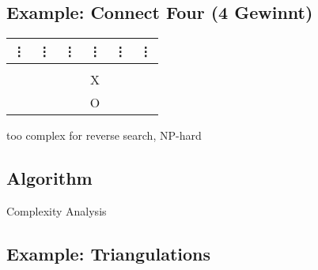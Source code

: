 \documentclass[11pt]{article}
\begin{document}
\subsection{Example: Connect Four (4 Gewinnt)}

\begin{tabular}{| c | c | c | c | c | c |}
\vdots & \vdots & \vdots & \vdots & \vdots & \vdots \\
\hline
& & & & & \\
\hline
& & & X & & \\
\hline
& & & O & & \\
\hline
\end{tabular} \newline

too complex for reverse search, NP-hard

\subsection{Algorithm}



Complexity Analysis

\subsection{Example: Triangulations}
\end{document}
